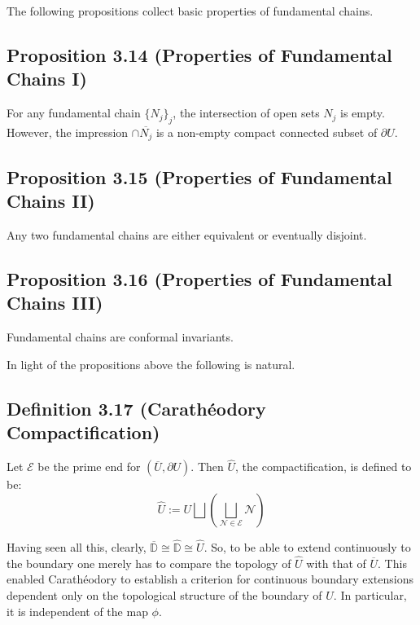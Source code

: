 \documentclass[11pt,a4paper]{article}
\begin{document}
        The following propositions collect basic properties of fundamental chains.

        \subsection*{Proposition 3.14 (Properties of Fundamental Chains I)} For any fundamental chain $\{N_j\}_j$, the intersection of open sets $N_j$ is empty. However, the impression $\cap \overline{N_j}$ is a non-empty compact connected subset of $\partial U$.


        \subsection*{Proposition 3.15 (Properties of Fundamental Chains II)} Any two fundamental chains are either equivalent or eventually disjoint.


        \subsection*{Proposition 3.16 (Properties of Fundamental Chains III)} Fundamental chains are conformal invariants.



        In light of the propositions above the following is natural.

        \subsection*{Definition 3.17 (Carath\'eodory Compactification)} Let $\mathcal{E}$ be the prime end for $(\overline{U}, \partial U)$. Then $\hat{U}$, the compactification, is defined to be:
        $$\hat{U}:= U\bigsqcup\left(\bigsqcup_{\mathcal{N} \in \mathcal{E}}{\mathcal{N}}\right)$$



        Having seen all this, clearly, $\overline{\mathbb{D}} \cong \hat{\mathbb{D}} \cong \hat{U}$. So, to be able to extend continuously to the boundary one merely has to compare the topology of $\hat{U}$ with that of $\overline{U}$. This enabled Carath\'eodory to establish a criterion for continuous boundary extensions dependent only on the topological structure of the boundary of $U$. In particular, it is independent of the map $\phi$.
\end{document}
